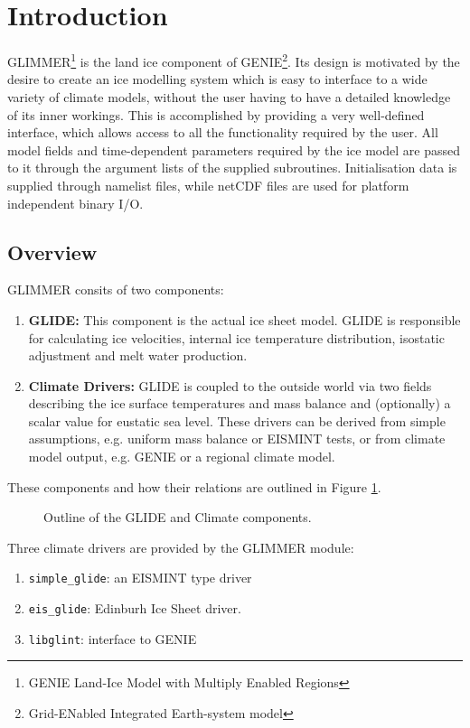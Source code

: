 \section{Introduction}

GLIMMER\footnote{GENIE Land-Ice Model with Multiply Enabled Regions} is the land ice component of GENIE\footnote{Grid-ENabled Integrated Earth-system model}. Its design is motivated by the desire to create an ice modelling system which is easy to interface to a wide variety of climate models, without the user having to have a detailed knowledge of its inner workings. This is accomplished by providing a very well-defined interface, which allows access to all the functionality required by the user. All model fields and time-dependent parameters required by the ice model are passed to it through the argument lists of the supplied subroutines. Initialisation data is supplied through namelist files, while netCDF files are used for platform independent binary I/O. 

\subsection{Overview}
GLIMMER consits of two components:
\begin{enumerate}
 \item {\bf GLIDE:} This component is the actual ice sheet model. GLIDE is responsible for calculating ice velocities, internal ice temperature distribution, isostatic adjustment and melt water production.
 \item {\bf Climate Drivers:} GLIDE is coupled to the outside world via two fields describing the ice surface temperatures and mass balance and (optionally) a scalar value for eustatic sea level. These drivers can be derived from simple assumptions, e.g. uniform mass balance or EISMINT tests, or from climate model output, e.g. GENIE or a regional climate model.
\end{enumerate}
These components and how their relations are outlined in Figure \ref{ug.glide}.

\begin{figure}[htb]
 \begin{center}
 \end{center}
 \caption{Outline of the GLIDE and Climate components.}
\label{ug.glide}
\end{figure}

Three climate drivers are provided by the GLIMMER module:
\begin{enumerate}
 \item \texttt{simple\_glide}: an EISMINT type driver
 \item \texttt{eis\_glide}: Edinburh Ice Sheet driver. 
 \item \texttt{libglint}: interface to GENIE
\end{enumerate}

